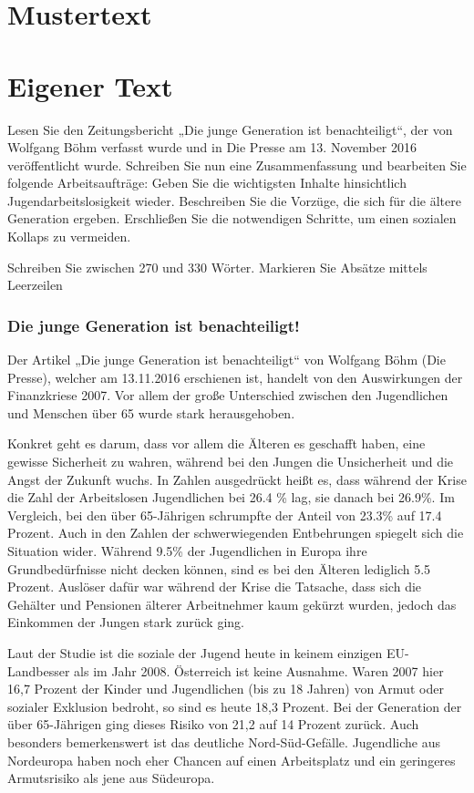   

\section{Mustertext}


\section{Eigener Text}

Lesen Sie den Zeitungsbericht „Die junge Generation ist benachteiligt“, der von Wolfgang Böhm verfasst wurde und in Die Presse am 13. November 2016 veröffentlicht wurde. Schreiben Sie nun eine Zusammenfassung und bearbeiten Sie folgende Arbeitsaufträge: Geben Sie die wichtigsten Inhalte hinsichtlich Jugendarbeitslosigkeit wieder. Beschreiben Sie die Vorzüge, die sich für die ältere Generation ergeben. Erschließen Sie die notwendigen Schritte, um einen sozialen Kollaps zu vermeiden.  

Schreiben Sie zwischen 270 und 330 Wörter. Markieren Sie Absätze mittels Leerzeilen 

\subsubsection{Die junge Generation ist benachteiligt!}
Der Artikel „Die junge Generation ist benachteiligt“ von Wolfgang Böhm (Die Presse), welcher am 13.11.2016 erschienen ist, handelt von den Auswirkungen der Finanzkriese 2007. Vor allem der große Unterschied zwischen den Jugendlichen und Menschen über 65 wurde stark herausgehoben.  

Konkret geht es darum, dass vor allem die Älteren es geschafft haben, eine gewisse Sicherheit zu wahren, während bei den Jungen die Unsicherheit und die Angst der Zukunft wuchs. In Zahlen ausgedrückt heißt es, dass während der Krise die Zahl der Arbeitslosen Jugendlichen bei 26.4 \% lag, sie danach bei 26.9\%. Im Vergleich, bei den über 65-Jährigen schrumpfte der Anteil von 23.3\% auf 17.4 Prozent. Auch in den Zahlen der schwerwiegenden Entbehrungen spiegelt sich die Situation wider. Während 9.5\% der Jugendlichen in Europa ihre Grundbedürfnisse nicht decken können, sind es bei den Älteren lediglich 5.5 Prozent. Auslöser dafür war während der Krise die Tatsache, dass sich die Gehälter und Pensionen älterer Arbeitnehmer kaum gekürzt wurden, jedoch das Einkommen der Jungen stark zurück ging.   

Laut der Studie ist die soziale der Jugend heute in keinem einzigen EU-Landbesser als im Jahr 2008. Österreich ist keine Ausnahme. Waren 2007 hier 16,7 Prozent der Kinder und Jugendlichen (bis zu 18 Jahren) von Armut oder sozialer Exklusion bedroht, so sind es heute 18,3 Prozent. Bei der Generation der über 65-Jährigen ging dieses Risiko von 21,2 auf 14 Prozent zurück. Auch besonders bemerkenswert ist das deutliche Nord-Süd-Gefälle. Jugendliche aus Nordeuropa haben noch eher Chancen auf einen Arbeitsplatz und ein geringeres Armutsrisiko als jene aus Südeuropa.  


